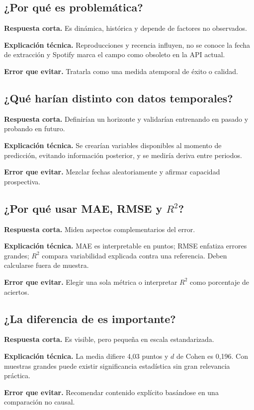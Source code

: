 \subsection*{¿Por qué  es problemática?}
\textbf{Respuesta corta.} Es dinámica, histórica y depende de factores no observados.\par
\textbf{Explicación técnica.} Reproducciones y recencia influyen, no se conoce la fecha de extracción
y Spotify marca el campo como obsoleto en la API actual.\par
\textbf{Error que evitar.} Tratarla como una medida atemporal de éxito o calidad.

\subsection*{¿Qué harían distinto con datos temporales?}
\textbf{Respuesta corta.} Definirían un horizonte y validarían entrenando en pasado y probando en
futuro.\par
\textbf{Explicación técnica.} Se crearían variables disponibles al momento de predicción, evitando
información posterior, y se mediría deriva entre periodos.\par
\textbf{Error que evitar.} Mezclar fechas aleatoriamente y afirmar capacidad prospectiva.

\subsection*{¿Por qué usar MAE, RMSE y $R^2$?}
\textbf{Respuesta corta.} Miden aspectos complementarios del error.\par
\textbf{Explicación técnica.} MAE es interpretable en puntos; RMSE enfatiza errores grandes; $R^2$
compara variabilidad explicada contra una referencia. Deben calcularse fuera de muestra.\par
\textbf{Error que evitar.} Elegir una sola métrica o interpretar $R^2$ como porcentaje de aciertos.

\subsection*{¿La diferencia de  es importante?}
\textbf{Respuesta corta.} Es visible, pero pequeña en escala estandarizada.\par
\textbf{Explicación técnica.} La media difiere 4,03 puntos y $d$ de Cohen es 0,196. Con muestras
grandes puede existir significancia estadística sin gran relevancia práctica.\par
\textbf{Error que evitar.} Recomendar contenido explícito basándose en una comparación no causal.

